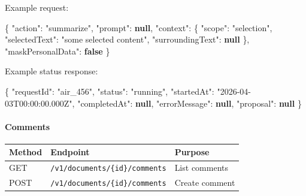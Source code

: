 \documentclass[a4paper]{article}
\newenvironment{Shaded}{}{}
\newcommand{\DataTypeTok}[1]{\textcolor[rgb]{0.56,0.13,0.00}{#1}}
\newcommand{\FunctionTok}[1]{\textcolor[rgb]{0.02,0.16,0.49}{#1}}
\newcommand{\KeywordTok}[1]{\textcolor[rgb]{0.00,0.44,0.13}{\textbf{#1}}}
\newcommand{\StringTok}[1]{\textcolor[rgb]{0.25,0.44,0.63}{#1}}
\begin{document}
Example request:

\begin{Shaded}
\begin{Highlighting}[]
\FunctionTok{\{}
  \DataTypeTok{"action"}\FunctionTok{:} \StringTok{"summarize"}\FunctionTok{,}
  \DataTypeTok{"prompt"}\FunctionTok{:} \KeywordTok{null}\FunctionTok{,}
  \DataTypeTok{"context"}\FunctionTok{:} \FunctionTok{\{}
    \DataTypeTok{"scope"}\FunctionTok{:} \StringTok{"selection"}\FunctionTok{,}
    \DataTypeTok{"selectedText"}\FunctionTok{:} \StringTok{"some selected content"}\FunctionTok{,}
    \DataTypeTok{"surroundingText"}\FunctionTok{:} \KeywordTok{null}
  \FunctionTok{\},}
  \DataTypeTok{"maskPersonalData"}\FunctionTok{:} \KeywordTok{false}
\FunctionTok{\}}
\end{Highlighting}
\end{Shaded}

Example status response:

\begin{Shaded}
\begin{Highlighting}[]
\FunctionTok{\{}
  \DataTypeTok{"requestId"}\FunctionTok{:} \StringTok{"air\_456"}\FunctionTok{,}
  \DataTypeTok{"status"}\FunctionTok{:} \StringTok{"running"}\FunctionTok{,}
  \DataTypeTok{"startedAt"}\FunctionTok{:} \StringTok{"2026{-}04{-}03T00:00:00.000Z"}\FunctionTok{,}
  \DataTypeTok{"completedAt"}\FunctionTok{:} \KeywordTok{null}\FunctionTok{,}
  \DataTypeTok{"errorMessage"}\FunctionTok{:} \KeywordTok{null}\FunctionTok{,}
  \DataTypeTok{"proposal"}\FunctionTok{:} \KeywordTok{null}
\FunctionTok{\}}
\end{Highlighting}
\end{Shaded}

\paragraph{Comments}\label{comments}

\begin{table}[h]
\small
\begin{tabularx}{\textwidth}{@{}L{14mm}L{46mm}Y@{}}
\toprule
Method & Endpoint & Purpose \\
\midrule
GET & \texttt{/v1/documents/\{id\}/comments} & List comments \\
POST & \texttt{/v1/documents/\{id\}/comments} & Create comment \\
\bottomrule
\end{tabularx}
\end{table}
\end{document}

